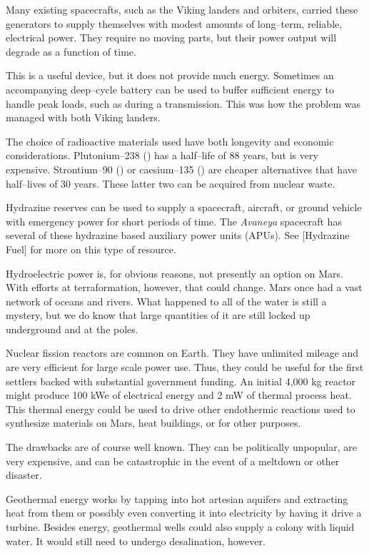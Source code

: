 Many existing spacecrafts, such as the Viking landers and orbiters, carried these generators to supply themselves with modest amounts of long--term, reliable, electrical power. They require no moving parts, but their power output will degrade as a function of time.

This is a useful device, but it does not provide much energy. Sometimes an accompanying deep--cycle battery can be used to buffer sufficient energy to handle peak loads, such as during a transmission. This was how the problem was managed with both Viking landers.

The choice of radioactive materials used have both longevity and economic considerations. Plutonium--238 () has a half--life of 88 years, but is very expensive. Strontium--90 () or caesium--135 () are cheaper alternatives that have half--lives of 30 years. These latter two can be acquired from nuclear waste.

Hydrazine reserves can be used to supply a spacecraft, aircraft, or ground vehicle with emergency power for short periods of time. The {\it Avaneya} spacecraft has several of these hydrazine based auxiliary power units (APUs). See [Hydrazine Fuel] for more on this type of resource.

Hydroelectric power is, for obvious reasons, not presently an option on Mars. With efforts at terraformation, however, that could change. Mars once had a vast network of oceans and rivers. What happened to all of the water is still a mystery, but we do know that large quantities of it are still locked up underground and at the poles.

Nuclear fission reactors are common on Earth. They have unlimited mileage and are very efficient for large scale power use. Thus, they could be useful for the first settlers backed with substantial government funding. An initial 4,000 kg reactor might produce 100 kWe of electrical energy and 2 mW of thermal process heat. This thermal energy could be used to drive other endothermic reactions used to synthesize materials on Mars, heat buildings, or for other purposes.

The drawbacks are of course well known. They can be politically unpopular, are very expensive, and can be catastrophic in the event of a meltdown or other disaster.

Geothermal energy works by tapping into hot artesian aquifers and extracting heat from them or possibly even converting it into electricity by having it drive a turbine. Besides energy, geothermal wells could also supply a colony with liquid water. It would still need to undergo desalination, however.

